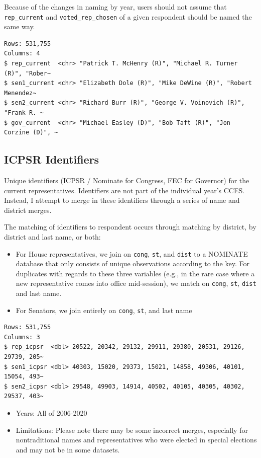 \documentclass[10pt,article,oneside]{memoir}
\theoremstyle{definition}
\begin{document}
Because of the changes in naming by year, users should not assume that
\texttt{rep\_current} and \texttt{voted\_rep\_chosen} of a given
respondent should be named the same way.

\begin{verbatim}
Rows: 531,755
Columns: 4
$ rep_current  <chr> "Patrick T. McHenry (R)", "Michael R. Turner (R)", "Rober~
$ sen1_current <chr> "Elizabeth Dole (R)", "Mike DeWine (R)", "Robert Menendez~
$ sen2_current <chr> "Richard Burr (R)", "George V. Voinovich (R)", "Frank R. ~
$ gov_current  <chr> "Michael Easley (D)", "Bob Taft (R)", "Jon Corzine (D)", ~
\end{verbatim}

\hypertarget{icpsr-identifiers}{%
\subsection{ICPSR Identifiers}\label{icpsr-identifiers}}

Unique identifiers (ICPSR / Nominate for Congress, FEC for Governor) for
the current representatives. Identifiers are not part of the individual
year's CCES. Instead, I attempt to merge in these identifiers through a
series of name and district merges.

The matching of identifiers to respondent occurs through matching by
district, by district and last name, or both:

\begin{itemize}
\tightlist
\item
  For House representatives, we join on \texttt{cong}, \texttt{st}, and
  \texttt{dist} to a NOMINATE database that only consists of unique
  observations according to the key. For duplicates with regards to
  these three variables (e.g., in the rare case where a new
  representative comes into office mid-session), we match on
  \texttt{cong}, \texttt{st}, \texttt{dist} and last name.
\item
  For Senators, we join entirely on \texttt{cong}, \texttt{st}, and last
  name
\end{itemize}

\begin{verbatim}
Rows: 531,755
Columns: 3
$ rep_icpsr  <dbl> 20522, 20342, 29132, 29911, 29380, 20531, 29126, 29739, 205~
$ sen1_icpsr <dbl> 40303, 15020, 29373, 15021, 14858, 49306, 40101, 15054, 493~
$ sen2_icpsr <dbl> 29548, 49903, 14914, 40502, 40105, 40305, 40302, 29537, 403~
\end{verbatim}

\begin{itemize}
\tightlist
\item
  Years: All of 2006-2020
\item
  Limitations: Please note there may be some incorrect merges,
  especially for nontraditional names and representatives who were
  elected in special elections and may not be in some datasets.
\end{itemize}
\end{document}
